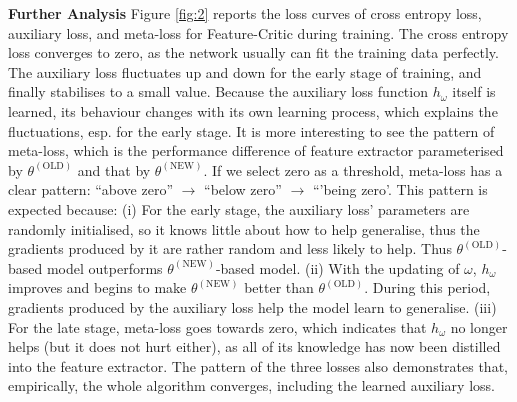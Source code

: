 \documentclass{article}
\newcommand{\modelname}{Feature-Critic}
\newcommand{\keypoint}[1]{\vspace{0.0cm}\noindent\textbf{#1}\quad}
\begin{document}
\keypoint{Further Analysis} 
Figure \ref{fig:2} reports the loss curves of cross entropy loss, auxiliary loss, and meta-loss for \modelname{} during training. The cross entropy loss converges to zero, as the network usually can fit the training data perfectly. The auxiliary loss fluctuates up and down for the early stage of training, and finally stabilises to a small value. Because the auxiliary loss function $h_\omega$ itself is learned, its behaviour changes with its own learning process, which explains the fluctuations, esp. for the early stage. It is more interesting to see the pattern of meta-loss, which is the performance difference of feature extractor parameterised by $\theta^{(\text{OLD})}$ and that by $\theta^{(\text{NEW})}$. If we select zero as a threshold, meta-loss has a clear pattern: ``above zero'' $\rightarrow$ ``below zero'' $\rightarrow$ ``'being zero'. This pattern is expected because: (i) For the early stage, the auxiliary loss' parameters are randomly initialised, so it knows little about how to help generalise, thus the gradients produced by it are rather random and less likely to help. Thus $\theta^{(\text{OLD})}$-based model outperforms $\theta^{(\text{NEW})}$-based model. (ii) With the updating of $\omega$, $h_\omega$ improves and begins to make $\theta^{(\text{NEW})}$ better than $\theta^{(\text{OLD})}$. During this period, gradients produced by the auxiliary loss help the model learn to generalise. (iii) For the late stage, meta-loss goes towards zero, which indicates that $h_\omega$ no longer helps (but it does not hurt either), as all of its knowledge has now been distilled into the feature extractor. The pattern of the three losses also demonstrates that, empirically, the whole algorithm converges, including the learned auxiliary loss.
\end{document}
